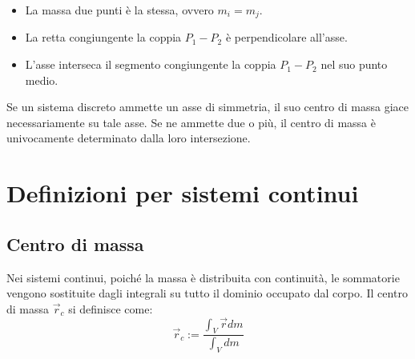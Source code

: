 \documentclass[11pt, a4paper, openright]{book}
\theoremstyle{plain}
\theoremstyle{definition}
\begin{document}
\begin{itemize}
    \item La massa due punti è la stessa, ovvero $m_i = m_j$.
    \item La retta congiungente la coppia $P_1-P_2$ è perpendicolare all'asse.
    \item L'asse interseca il segmento congiungente la coppia $P_1-P_2$ nel suo punto medio.
\end{itemize}

Se un sistema discreto ammette un asse di simmetria, il suo centro di massa giace necessariamente su tale asse. Se ne ammette due o più, il centro di massa è univocamente determinato dalla loro intersezione.

\newpage

\section{Definizioni per sistemi continui}
\subsection{Centro di massa}
Nei sistemi continui, poiché la massa è distribuita con continuità, le sommatorie vengono sostituite dagli integrali su tutto il dominio occupato dal corpo. Il centro di massa $\vec{r}_c$ si definisce come:
\[\vec{r}_c := \frac{\int_V \vec{r}  dm}{\int_V dm}\]
\end{document}
